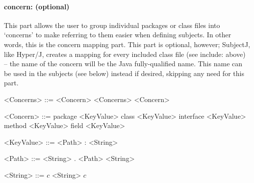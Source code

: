 \documentclass[11pt,letterpaper]{article}
\begin{document}
    \paragraph{concern: (optional)}
    This part allows the user to group individual packages or class files into `concerns' to make referring to them easier when defining subjects. In other words, this is the concern mapping part. This part is optional, however; SubjectJ, like Hyper/J, creates a mapping for every included class file (see include: above) -- the name of the concern will be the Java fully-qualified name. This name can be used in the subjects (see below) instead if desired, skipping any need for this part.
    \begin{grammar}
        <Concerns> ::= <Concern> <Concerns>
        \alt <Concern>

        <Concern> ::= package <KeyValue>
        \alt class <KeyValue>
        \alt interface <KeyValue>
        \alt method <KeyValue>
        \alt field <KeyValue>

        <KeyValue> ::= <Path> : <String>

        <Path> ::= <String> . <Path>
        \alt <String>

        <String> ::= $c$ <String>
        \alt $c$
    \end{grammar}
\end{document}
